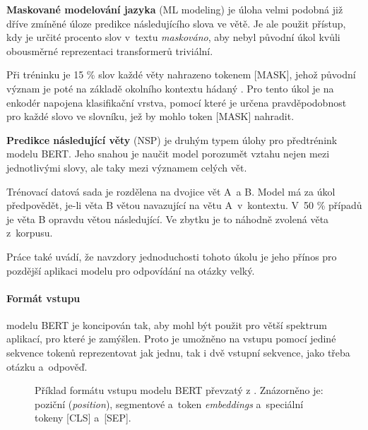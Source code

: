\medskip
\textbf{Maskované modelování jazyka} (ML modeling) 
je úloha velmi podobná již dříve zmíněné úloze predikce následujícího slova ve větě. Je ale použit přístup, kdy je určité procento slov v~textu \emph{maskováno}, aby nebyl původní úkol kvůli obousměrné reprezentaci transformerů triviální.\par
Při tréninku je 15 \% slov každé věty nahrazeno tokenem [MASK], jehož původní význam je poté na základě okolního kontextu hádaný \cite{BERT}. Pro tento úkol je na enkodér napojena klasifikační vrstva, pomocí které je určena pravděpodobnost pro každé slovo ve slovníku, jež by mohlo token [MASK] nahradit.\par
\smallskip
\textbf{Predikce následující věty} (NSP) je druhým typem úlohy pro předtrénink modelu BERT. Jeho snahou je naučit model porozumět vztahu nejen mezi jednotlivými slovy, ale taky mezi významem celých vět.\par
Trénovací datová sada je rozdělena na dvojice vět A~a B. Model má za úkol předpovědět, je-li věta B větou navazující na větu A~v~kontextu. V~50 \% případů je věta B opravdu větou následující. Ve zbytku je to náhodně zvolená věta z~korpusu.\par
Práce \cite{BERT} také uvádí, že navzdory jednoduchosti tohoto úkolu je jeho přínos pro pozdější aplikaci modelu pro odpovídání na otázky velký.\par

\paragraph{Formát vstupu}
modelu BERT je koncipován tak, aby mohl být použit pro větší spektrum aplikací, pro které je zamýšlen. Proto je umožněno na vstupu pomocí jediné sekvence tokenů reprezentovat jak jednu, tak i dvě vstupní sekvence, jako třeba otázku a~odpověď.

\begin{figure}[hbt]
	\centering
	\caption{Příklad formátu vstupu  modelu BERT převzatý z \cite{BERT}. Znázorněno je: poziční (\emph{position}), segmentové a~token \emph{embeddings} a~speciální tokeny [CLS] a~[SEP].}
	\label{bert_input}
\end{figure}

